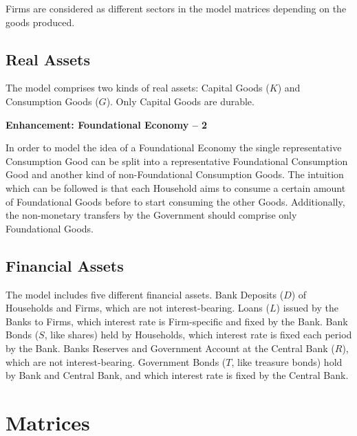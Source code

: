 \documentclass[a4paper, headings=standardclasses]{scrartcl}
\newenvironment{enh}[1][]{\begin{framed}\noindent\textbf{Enhancement: #1}\par}{\end{framed}}
\begin{document}
Firms are considered as different sectors in the model matrices depending on the goods produced.

\subsection{Real Assets}
The model comprises two kinds of real assets: Capital Goods ($K$) and Consumption Goods ($G$).
Only Capital Goods are durable.

\begin{enh}[Foundational Economy -- 2]
	In order to model the idea of a Foundational Economy the single representative Consumption Good can be split into a representative Foundational Consumption Good and another kind of non-Foundational Consumption Goods.
	The intuition which can be followed is that each Household aims to consume a certain amount of Foundational Goods before to start consuming the other Goods. Additionally, the non-monetary transfers by the Government should comprise only Foundational Goods.
\end{enh}

\subsection{Financial Assets}
The model includes five different financial assets.
Bank Deposits ($D$) of Households and Firms, which are not interest-bearing.
Loans ($L$) issued by the Banks to Firms, which interest rate is Firm-specific and fixed by the Bank.
Bank Bonds ($S$, like shares) held by Households, which interest rate is fixed each period by the Bank.
Banks Reserves and Government Account at the Central Bank ($R$), which are not interest-bearing.
Government Bonds ($T$, like treasure bonds) hold by Bank and Central Bank, and which interest rate is fixed by the Central Bank.

\section{Matrices}
\end{document}
